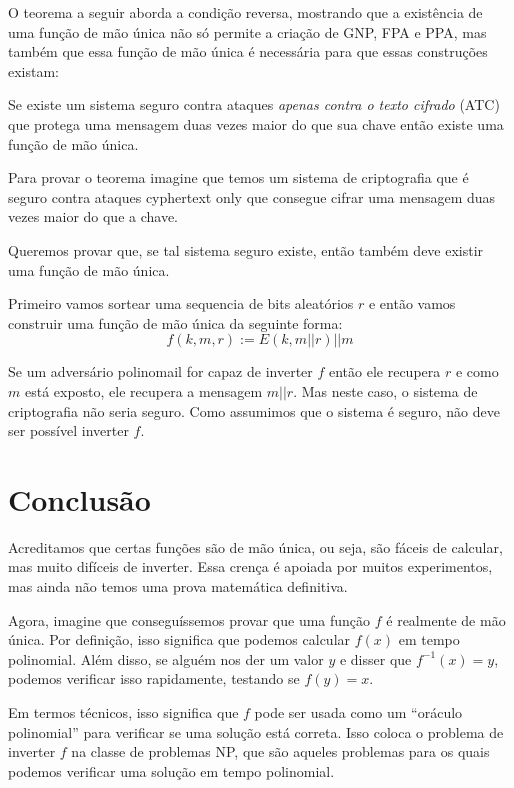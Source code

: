 O teorema a seguir aborda a condição reversa, mostrando que a existência de uma função de mão única não só permite a criação de GNP, FPA e PPA, mas também que essa função de mão única é necessária para que essas construções existam:

\begin{theorem}
  Se existe um sistema seguro contra ataques {\em apenas contra o texto cifrado} (ATC) que protega uma mensagem duas vezes maior do que sua chave então existe uma função de mão única.
\end{theorem}

Para provar o teorema imagine que temos um sistema de criptografia que é seguro contra ataques cyphertext only que consegue cifrar uma mensagem duas vezes maior do que a chave.

Queremos provar que, se tal sistema seguro existe, então também deve existir uma função de mão única.

Primeiro vamos sortear uma sequencia de bits aleatórios $r$ e então vamos construir uma função de mão única da seguinte forma:
\begin{displaymath}
  f(k, m, r) := E(k, m||r)||m
\end{displaymath}

Se um adversário polinomail for capaz de inverter $f$ então ele recupera $r$ e como $m$ está exposto, ele recupera a mensagem $m||r$.
Mas neste caso, o sistema de criptografia não seria seguro.
Como assumimos que o sistema é seguro, não deve ser possível inverter $f$.

\section{Conclusão}

Acreditamos que certas funções são de mão única, ou seja, são fáceis de calcular, mas muito difíceis de inverter.
Essa crença é apoiada por muitos experimentos, mas ainda não temos uma prova matemática definitiva.

Agora, imagine que conseguíssemos provar que uma função $f$ é realmente de mão única.
Por definição, isso significa que podemos calcular $f(x)$ em tempo polinomial.
Além disso, se alguém nos der um valor $y$ e disser que $f^{-1}(x) = y$, podemos verificar isso rapidamente, testando se $f(y)=x$.

Em termos técnicos, isso significa que $f$ pode ser usada como um ``oráculo polinomial'' para verificar se uma solução está correta.
Isso coloca o problema de inverter $f$ na classe de problemas NP, que são aqueles problemas para os quais podemos verificar uma solução em tempo polinomial.

